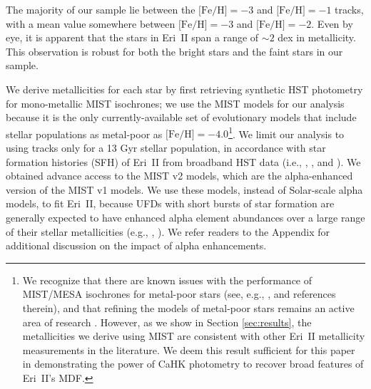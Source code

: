 \documentclass[twocolumn]{aastex63}
\begin{document}
\par The majority of our sample lie between the $\mbox{[Fe/H]}=-3$ and $\mbox{[Fe/H]}=-1$ tracks, with a mean value somewhere between $\mbox{[Fe/H]}=-3$ and $\mbox{[Fe/H]}=-2$. Even by eye, it is apparent that the stars in Eri~II span a range of $\sim2$ dex in metallicity. This observation is robust for both the bright stars and the faint stars in our sample. 

\par We derive metallicities for each star by first retrieving synthetic HST photometry for mono-metallic MIST isochrones; we use the MIST models for our analysis because it is the only currently-available set of evolutionary models that include stellar populations as metal-poor as $\mbox{[Fe/H]}=-4.0$\footnote{We recognize that there are known issues with the performance of MIST/MESA isochrones for metal-poor stars (see, e.g., \citealt{kielty2021}, and references therein), and that refining the models of metal-poor stars remains an active area of research \citep[e.g., ][]{karovicova2020}. However, as we show in Section \ref{sec:results}, the metallicities we derive using MIST are consistent with other Eri~II metallicity measurements in the literature. We deem this result sufficient for this paper in demonstrating the power of CaHK photometry to recover broad features of Eri~II's MDF.}. We limit our analysis to using tracks only for a 13 Gyr stellar population, in accordance with star formation histories (SFH) of Eri~II from broadband HST data (i.e., \citealt{simon2021EriII}, \citealt{gallart2021eriii}, and \citealt{alzate2021eriii}). We obtained advance access to the MIST v2 models, which are the alpha-enhanced version of the MIST v1 models. We use these models, instead of Solar-scale alpha models, to fit Eri~II, because UFDs with short bursts of star formation are generally expected to have enhanced alpha element abundances over a large range of their stellar metallicities (e.g., \citealt{vargas2013alpha}, \citealt{frebel2014segue1}). We refer readers to the Appendix for additional discussion on the impact of alpha enhancements.
\end{document}
